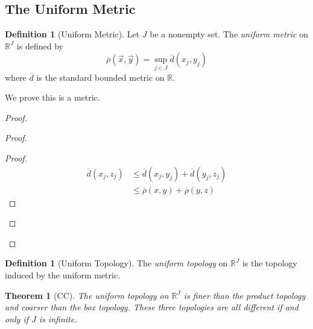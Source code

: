 \documentclass{book}
\newtheorem{thm}[lm]{Theorem}
\theoremstyle{definition}
\newtheorem{df}[lm]{Definition}
\begin{document}
  \subsection{The Uniform Metric}
  
  \begin{df}[Uniform Metric]
    Let $J$ be a nonempty set.
    The \emph{uniform metric} on $\mathbb{R}^J$ is defined by
    \[ \overline{\rho}(\vec{x}, \vec{y}) = \sup_{j \in J} \overline{d}(x_j, y_j) 
    \]
    where $\overline{d}$ is the standard bounded metric on $\mathbb{R}$.
    
    We prove this is a metric.
  \end{df}
  
  \begin{proof}
    \begin{proof}
      \begin{proof}
        \pf\ \begin{align*}
          \overline{d}(x_j, z_j) & \leq \overline{d}(x_j, y_j) + 
          \overline{d}(y_j, z_j) \\
          & \leq \overline{\rho}(x, y) + \overline{\rho}(y, z)
        \end{align*}
      \end{proof}
    \end{proof}
  \end{proof}
  
  \begin{df}[Uniform Topology]
    The \emph{uniform topology} on $\mathbb{R}^J$ is the topology induced by 
    the 
    uniform metric.
  \end{df}
  
  \begin{thm}[CC]
    The uniform topology on $\mathbb{R}^J$ is finer than the product topology 
    and 
    coarser than the box topology. These three topologies are all different if 
    and 
    only if $J$ is infinite.
  \end{thm}
  
\end{document}
